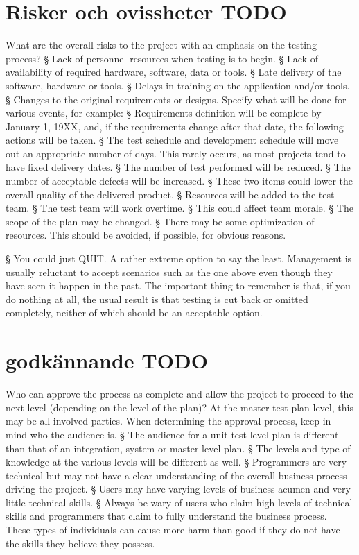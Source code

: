 \documentclass[10pt]{article}
\begin{document}
\section{Risker och ovissheter {\color{red}TODO}}
What are the overall risks to the project with an emphasis on the testing process? 
§ 
Lack of personnel resources when testing is to begin. 
§ 
Lack of availability of required hardware, software, data or tools. 
§ 
Late delivery of the software, hardware or tools. 
§ 
Delays in training on the application and/or tools. 
§ 
Changes to the original requirements or designs. 
Specify what will be done for various events, for example: 
§ 
Requirements definition will be complete by January 1, 19XX, and, if the requirements 
change after that date, the following actions will be taken. 
§ 
The test schedule and development schedule will move out an appropriate number of 
days.  This rarely occurs, as most projects tend to have fixed delivery dates. 
§ 
The number of test performed will be reduced. 
§ 
The number of acceptable defects will be increased. 
§ 
These two items could lower the overall quality of the delivered product. 
§ 
Resources will be added to the test team. 
§ 
The test team will work overtime. 
§ 
This could affect team morale. 
§ 
The scope of the plan may be changed. 
§ 
There may be some optimization of resources.  This should be avoided, if possible, 
for obvious reasons. 

§ 
You could just QUIT.  A rather extreme option to say the least. 
Management is usually reluctant to accept scenarios such as the one above even though they 
have seen it happen in the past. 
The important thing to remember is that, if you do nothing at all, the usual result is that 
testing is cut back or omitted completely, neither of which should be an acceptable option. 

\section{godkännande {\color{red}TODO}}

Who can approve the process as complete and allow the project to proceed to the next level 
(depending on the level of the plan)? 
At the master test plan level, this may be all involved parties. 
When determining the approval process, keep in mind who the audience is.  
§ 
The audience for a unit test level plan is different than that of an integration, system or 
master level plan. 
§ 
The levels and type of knowledge at the various levels will be different as well. 
§ 
Programmers are very technical but may not have a clear understanding of the overall 
business process driving the project. 
§ 
Users may have varying levels of business acumen and very little technical skills. 
§ 
Always be wary of users who claim high levels of technical skills and programmers that 
claim to fully understand the business process.  These types of individuals can cause more 
harm than good if they do not have the skills they believe they possess. 
\end{document}
